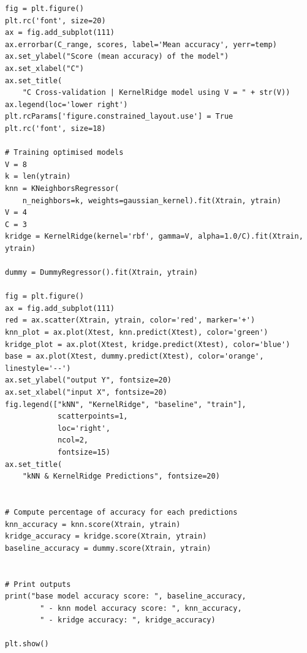 \documentclass[10pt]{article}
\begin{document}
\begin{lstlisting}
fig = plt.figure()
plt.rc('font', size=20)
ax = fig.add_subplot(111)
ax.errorbar(C_range, scores, label='Mean accuracy', yerr=temp)
ax.set_ylabel("Score (mean accuracy) of the model")
ax.set_xlabel("C")
ax.set_title(
    "C Cross-validation | KernelRidge model using V = " + str(V))
ax.legend(loc='lower right')
plt.rcParams['figure.constrained_layout.use'] = True
plt.rc('font', size=18)

# Training optimised models
V = 8
k = len(ytrain)
knn = KNeighborsRegressor(
    n_neighbors=k, weights=gaussian_kernel).fit(Xtrain, ytrain)
V = 4
C = 3
kridge = KernelRidge(kernel='rbf', gamma=V, alpha=1.0/C).fit(Xtrain, ytrain)

dummy = DummyRegressor().fit(Xtrain, ytrain)

fig = plt.figure()
ax = fig.add_subplot(111)
red = ax.scatter(Xtrain, ytrain, color='red', marker='+')
knn_plot = ax.plot(Xtest, knn.predict(Xtest), color='green')
kridge_plot = ax.plot(Xtest, kridge.predict(Xtest), color='blue')
base = ax.plot(Xtest, dummy.predict(Xtest), color='orange', linestyle='--')
ax.set_ylabel("output Y", fontsize=20)
ax.set_xlabel("input X", fontsize=20)
fig.legend(["kNN", "KernelRidge", "baseline", "train"],
            scatterpoints=1,
            loc='right',
            ncol=2,
            fontsize=15)
ax.set_title(
    "kNN & KernelRidge Predictions", fontsize=20)


# Compute percentage of accuracy for each predictions
knn_accuracy = knn.score(Xtrain, ytrain)
kridge_accuracy = kridge.score(Xtrain, ytrain)
baseline_accuracy = dummy.score(Xtrain, ytrain)


# Print outputs
print("base model accuracy score: ", baseline_accuracy,
        " - knn model accuracy score: ", knn_accuracy,
        " - kridge accuracy: ", kridge_accuracy)

plt.show()
\end{lstlisting}
\end{document}
